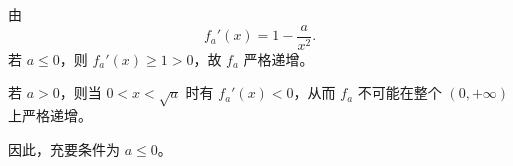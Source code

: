 由
\[
f_a'(x)=1-\frac{a}{x^2}.
\]
若 $a\le0$，则 $f_a'(x)\ge1>0$，故 $f_a$ 严格递增。

若 $a>0$，则当 $0<x<\sqrt a$ 时有 $f_a'(x)<0$，从而 $f_a$ 不可能在整个 $(0,+\infty)$ 上严格递增。

因此，充要条件为 $\boxed{a\le0}$。
